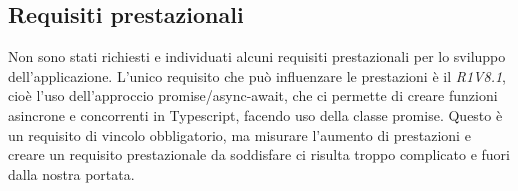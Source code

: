\subsection{Requisiti prestazionali}
Non sono stati richiesti e individuati alcuni requisiti prestazionali per lo sviluppo dell'applicazione. L'unico requisito che può influenzare le prestazioni è il \textit{R1V8.1}, cioè l'uso dell'approccio promise/async-await, che ci permette di creare funzioni asincrone e concorrenti in Typescript, facendo uso della classe promise. Questo è un requisito di vincolo obbligatorio, ma misurare l'aumento di prestazioni e creare un requisito prestazionale da soddisfare ci risulta troppo complicato e fuori dalla nostra portata.